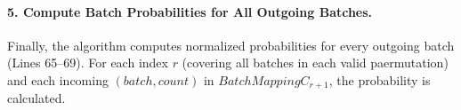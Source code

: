 \documentclass{article}
\begin{document}
\paragraph{5. Compute Batch Probabilities for All Outgoing Batches.}
Finally, the algorithm computes normalized probabilities for every outgoing batch (Lines 65–69).  
For each index $r$ (covering all batches in each valid paermutation) and each incoming $(batch, count)$ in $BatchMappingC_{r+1}$, the probability is calculated.


\end{document}
